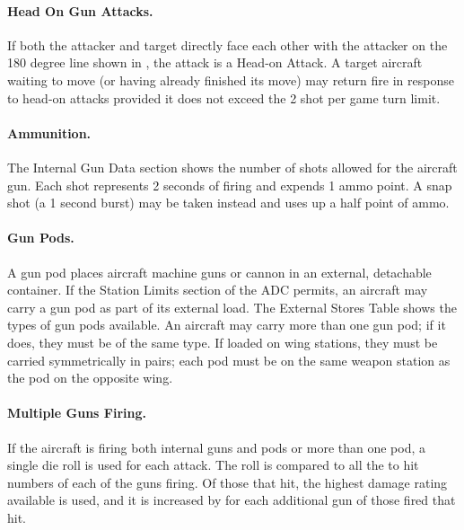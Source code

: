 \paragraph{Head On Gun Attacks.} If both the attacker and target directly face each other with the attacker on the 180 degree line shown in , the attack is a Head-on Attack. A target aircraft waiting to move (or having already finished its move) may return fire in response to head-on attacks provided it does not exceed the 2 shot per game turn limit.  

\paragraph{Ammunition.} 
The Internal Gun Data section shows the number of shots allowed for the aircraft gun. Each shot represents 2 seconds of firing and expends 1 ammo point. A snap shot (a 1 second burst) may be taken instead and uses up a half point of ammo.

\paragraph{Gun Pods.} 
A gun pod places aircraft machine guns or cannon in an external, detachable container. If the Station Limits section of the ADC permits, an aircraft may carry a gun pod as part of its external load. The External Stores Table shows the types of gun pods available. An aircraft may carry more than one gun pod; if it does, they must be of the same type. If loaded on wing stations, they must be carried symmetrically in pairs; each pod must be on the same weapon station as the pod on the opposite wing.

\paragraph{Multiple Guns Firing.} 
If the aircraft is firing both internal guns and pods or more than one pod, a single die roll is used for each attack. The roll is compared to all the to hit numbers of each of the guns firing. Of those that hit, the highest damage rating available is used, and it is increased by  for each additional gun of those fired that hit.

